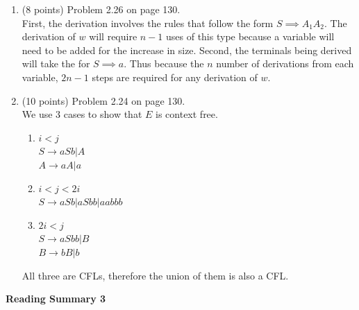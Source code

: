 \documentclass[11pt]{article}
\begin{document}
\begin{enumerate}
  \item (8 points) Problem 2.26 on page 130. \\
    First, the derivation involves the rules that follow the form $S \implies A_1A_2$.
    The derivation of $w$ will require $n-1$ uses of this type because a variable
    will need to be added for the increase in size. Second, the terminals being derived
    will take the for $S \implies a$. Thus because the $n$ number of derivations from
    each variable, $2n-1$ steps are required for any derivation of $w$.
    
  \item (10 points) Problem 2.24 on page 130. \\
    We use 3 cases to show that $E$ is context free.
    \begin{enumerate}
      \item $i < j $ \\
	    $S \to aSb | A $ \\
	    $A \to aA | a$
      \item $i<j<2i$ \\
	    $S \to aSb | aSbb | aabbb$
      \item $2i < j$ \\
	    $S \to aSbb|B $ \\
	    $B \to bB | b $
    \end{enumerate}
    All three are CFLs, therefore the union of them is also a CFL.

\end{enumerate}

\pagebreak
\setlength{\parindent}{1cm}
\centerline{\bf Reading Summary 3}
\end{document}
